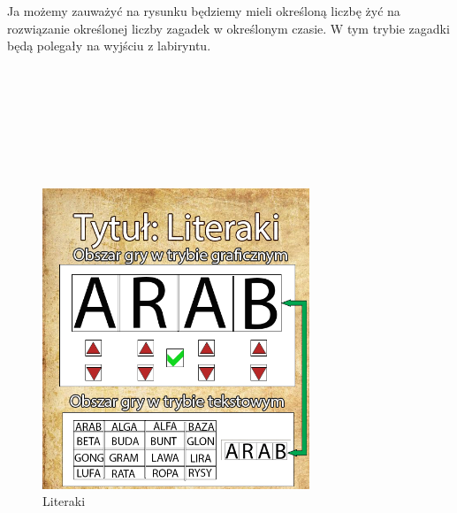 Ja możemy zauważyć na rysunku będziemy mieli określoną liczbę żyć na rozwiązanie określonej liczby zagadek w określonym czasie. W tym trybie zagadki będą polegały na wyjściu z labiryntu.
\\
\\
\\
\\
\\
\\
\\
\\
	\begin{figure}[!htb]
	\begin{center}
		\includegraphics[width=8cm]{rys/gra4.png}
		\caption{Literaki}
		\label{rys:rysunek001}
	\end{center}
\end{figure}

